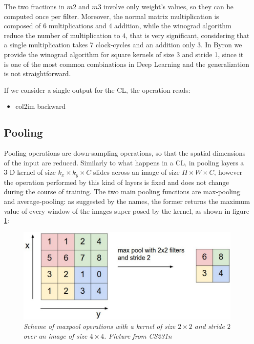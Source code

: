 \documentclass[12pt,a4paper]{report}
\begin{document}
The two fractions in $m2$ and $m3$ involve only weight's values, so they can be computed once per filter. Moreover, the normal matrix multiplication is composed of 6 multiplications and 4 addition, while the winograd algorithm reduce the number of multiplication to 4, that is very significant, considering that a  single multiplication takes 7 clock-cycles and an addition only 3. 
In Byron we provide the winograd algorithm for square kernels of size 3 and stride 1, since it is one of the most common combinations in Deep Learning and the generalization is not straightforward.

If we consider a single output for the CL, the operation reads: 
\begin{itemize}
 \item col2im backward
\end{itemize}
 
\subsection*{Pooling}

Pooling operations are down-sampling operations, so that the spatial dimensions of the input are reduced. Similarly to what happens in a CL, in pooling layers a 3-D kernel of size $k_x \times k_y \times C$ slides across an image of size $H \times W \times C$, however the operation performed by this kind of layers is fixed and does not change during the course of training.
The two main pooling functions are max-pooling and average-pooling: as suggested by the names, the former  
returns the maximum value of every window of the images super-posed by the kernel, as shown in figure \ref{fig:maxpool}:

\begin{figure}[h]
 \centering
 \includegraphics[scale=0.35]{./images/maxpool.png}
 \caption{\it Scheme of maxpool operations with a kernel of size $2 \times 2$ and stride $2$ over an image of size $4 \times 4$. Picture from CS231n}
 \label{fig:maxpool}
\end{figure}
\end{document}
